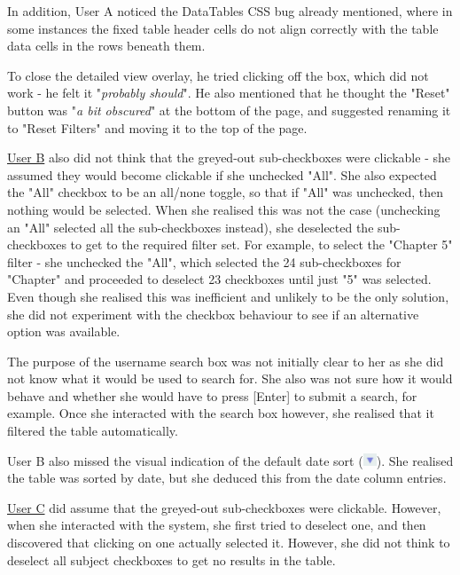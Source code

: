 In addition, User A noticed the DataTables CSS bug already mentioned, where in some instances the fixed table header cells do not align correctly with the table data cells in the rows beneath them.

To close the detailed view overlay, he tried clicking off the box, which did not work - he felt it "\textit{probably should}". He also mentioned that he thought the "Reset" button was "\textit{a bit obscured}" at the bottom of the page, and suggested renaming it to "Reset Filters" and moving it to the top of the page. 

\underline{User B} also did not think that the greyed-out sub-checkboxes were clickable - she assumed they would become clickable if she unchecked "All". She also expected the "All" checkbox to be an all/none toggle, so that if "All" was unchecked, then nothing would be selected. When she realised this was not the case (unchecking an "All" selected all the sub-checkboxes instead), she deselected the sub-checkboxes to get to the required filter set. For example, to select the "Chapter 5" filter - she unchecked the "All", which selected the 24 sub-checkboxes for "Chapter" and proceeded to deselect 23 checkboxes until just "5" was selected. Even though she realised this was inefficient and unlikely to be the only solution, she did not experiment with the checkbox behaviour to see if an alternative option was available. 

The purpose of the username search box was not initially clear to her as she did not know what it would be used to search for. She also was not sure how it would behave and whether she would have to press [Enter] to submit a search, for example. Once she interacted with the search box however, she realised that it filtered the table automatically. 

User B also missed the visual indication of the default date sort (\includegraphics[width=0.4cm]{Figures/sortarrowdown.png}). She realised the table was sorted by date, but she deduced this from the date column entries.

\underline{User C} did assume that the greyed-out sub-checkboxes were clickable. However, when she interacted with the system, she first tried to deselect one, and then discovered that clicking on one actually selected it. However, she did not think to deselect all subject checkboxes to get no results in the table. 

